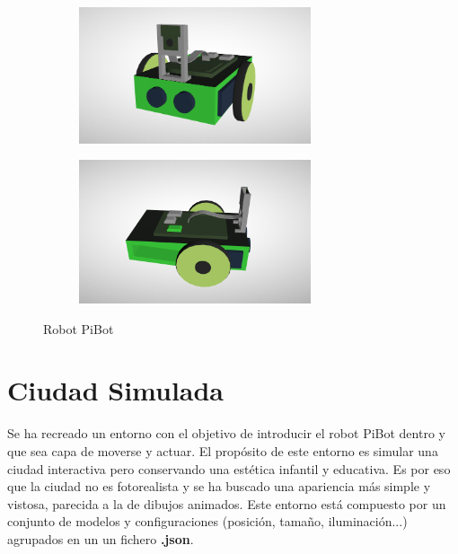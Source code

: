 \documentclass{report}
\begin{document}
\renewcommand{\figurename}{Figura}		
\begin{figure}[!h]
\centering
  \begin{subfigure}[b]{0.49\textwidth}
  \centering
    \includegraphics[width=0.75\textwidth, height=0.55\textwidth]{images/cap4/pibot-frontal.png}
    \label{fig:f1}
  \end{subfigure}
  \hfill
  \begin{subfigure}[b]{0.49\textwidth}
  \centering
    \includegraphics[width=0.75\textwidth, height=0.55\textwidth]{images/cap4/pibot-lateral.png}
    \label{fig:f2}
  \end{subfigure}
  \caption{Robot PiBot}
\end{figure}

\newpage
\section{Ciudad Simulada}

Se ha recreado un entorno con el objetivo de introducir el robot PiBot dentro y que sea capa de  moverse y actuar. El propósito de este entorno es simular una ciudad interactiva pero conservando una estética infantil y educativa. Es por eso que la ciudad no es fotorealista y se ha buscado una apariencia más simple y vistosa, parecida a la de dibujos animados. Este entorno está compuesto por un conjunto de modelos y configuraciones (posición, tamaño, iluminación...) agrupados en un un fichero \textbf{.json}.
\end{document}
